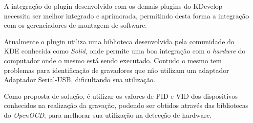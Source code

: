 A integração do plugin desenvolvido com os demais plugins do KDevelop necessita ser melhor integrado e aprimorada, permitindo desta
forma a integração com os gerenciadores de montagem de software.

Atualmente o plugin utiliza uma biblioteca desenvolvida pela comunidade do KDE conhecida como \textit{Solid}, onde permite uma boa integração com o \textit{hardwre} do computador onde o mesmo está sendo executado. Contudo o mesmo tem problemas para identificação de gravadores que não utilizam um adaptador Adaptador Serial-USB, dificultando sua utilização. 

Como proposta de solução, é utilizar os valores de PID e VID dos dispositivos conhecidos na realização da gravação, podendo ser obtidos através das bibliotecas do \textit{OpenOCD}, para melhorar sua utilização na detecção de hardware.

